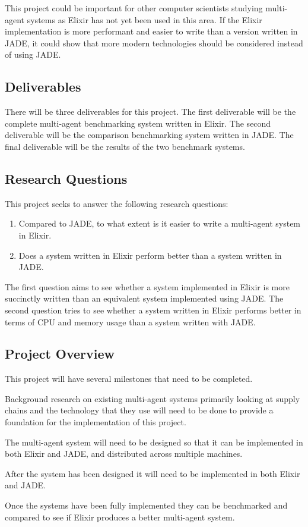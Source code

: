 This project could be important for other computer scientists studying multi-agent systems as Elixir has not yet been used in this area.
If the Elixir implementation is more performant and easier to write than a version written in JADE, it could show that more modern technologies should be considered instead of using JADE\@.

\subsection{Deliverables}

There will be three deliverables for this project.
The first deliverable will be the complete multi-agent benchmarking system written in Elixir.
The second deliverable will be the comparison benchmarking system written in JADE\@.
The final deliverable will be the results of the two benchmark systems.

\subsection{Research Questions}

This project seeks to answer the following research questions:

\begin{enumerate}
    \item Compared to JADE, to what extent is it easier to write a multi-agent system in Elixir.
    \item Does a system written in Elixir perform better than a system written in JADE\@.
\end{enumerate}

The first question aims to see whether a system implemented in Elixir is more succinctly written than an equivalent system implemented using JADE\@.
The second question tries to see whether a system written in Elixir performs better in terms of CPU and memory usage than a system written with JADE\@.

\subsection{Project Overview}

This project will have several milestones that need to be completed.

\begin{description}[style=nextline]
    \item [Literature Review] Background research on existing multi-agent systems primarily looking at supply chains and the technology that they use will need to be done to provide a foundation for the implementation of this project.
    \item [System Design] The multi-agent system will need to be designed so that it can be implemented in both Elixir and JADE, and distributed across multiple machines\@.
    \item [Implementation] After the system has been designed it will need to be implemented in both Elixir and JADE\@.
    \item [Analysis] Once the systems have been fully implemented they can be benchmarked and compared to see if Elixir produces a better multi-agent system.
\end{description}
